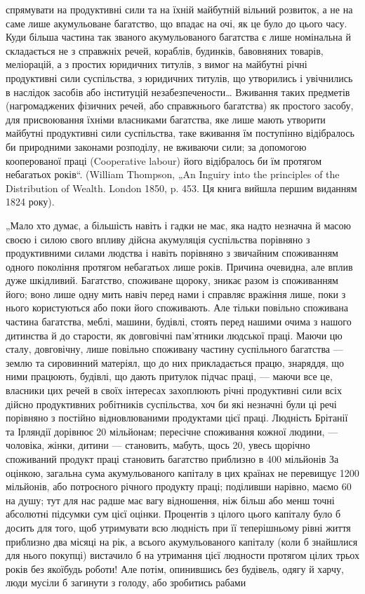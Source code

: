 \parcont{}  %
спрямувати на продуктивні сили та на їхній майбутній вільний розвиток,
а не на саме лише акумульоване багатство, що впадає на очі, як це
було до цього часу. Куди більша частина так званого акумульованого
багатства є лише номінальна й складається не з справжніх речей, кораблів,
будинків, бавовняних товарів, меліорацій, а з простих юридичних
титулів, з вимог на майбутні річні продуктивні сили суспільства, з юридичних
титулів, що утворились і увічнились в наслідок засобів або
інституцій незабезпечености\dots{} Вживання таких предметів (нагромаджених
фізичних речей, або справжнього багатства) як простого
засобу, для присвоювання їхніми власниками багатства, яке лише мають
утворити майбутні продуктивні сили суспільства, таке вживання їм поступінно
відібралось би природними законами розподілу, не вживаючи
сили; за допомогою кооперованої праці (Cooperative labour) його
відібралось би їм протягом небагатьох років“. (William Thompson, „An
Inguiry into the principles of the Distribution of Wealth. London 1850, p. 453.
Ця книга вийшла першим виданням 1824 року).

„Мало хто думає, а більшість навіть і гадки не має, яка надто
незначна й масою своєю і силою свого впливу дійсна акумуляція суспільства
порівняно з продуктивними силами людства і навіть порівняно
з звичайним споживанням одного покоління протягом небагатьох лише
років. Причина очевидна, але вплив дуже шкідливий. Багатство, споживане
щороку, зникає разом із споживанням його; воно лише одну мить
навіч перед нами і справляє вражіння лише, поки з нього користуються
або поки його споживають. Але тільки повільно споживана частина
багатства, меблі, машини, будівлі, стоять перед нашими очима з нашого
дитинства й до старости, як довговічні пам’ятники людської праці.
Маючи цю сталу, довговічну, лише повільно споживану частину суспільного
багатства — землю та сировинний матеріял, що до них прикладається
працю, знаряддя, що ними працюють, будівлі, що дають притулок підчас
праці, — маючи все це, власники цих речей в своїх інтересах захоплюють
річні продуктивні сили всіх дійсно продуктивних робітників суспільства,
хоч би які незначні були ці речі порівняно з постійно відновлюваними
продуктами цієї праці. Людність Брітанії та Ірляндії дорівнює 20 мільйонам;
пересічне споживання кожної людини, — чоловіка, жінки, дитини —
становить, мабуть, щось 20, увесь щорічно споживаний продукт
праці становить багатство приблизно в 400 мільйонів  За оцінкою,
загальна сума акумульованого капіталу в цих країнах не перевищує
1200 мільйонів, або потроєного річного продукту праці; поділивши
нарівно, маємо 60 на душу; тут для нас радше має вагу відношення,
ніж більш або менш точні абсолютні підсумки сум цієї оцінки.
Процентів з цілого цього капіталу було б досить для того, щоб утримувати
всю людність при її теперішньому рівні життя приблизно два
місяці на рік, а всього акумульованого капіталу (коли б знайшлися для
нього покупці) вистачило б на утримання цієї людности протягом цілих
трьох років без якоїбудь роботи! Але потім, опинившись без будівель,
одягу й харчу, люди мусіли б загинути з голоду, або зробитись рабами
\parbreak{}  %
